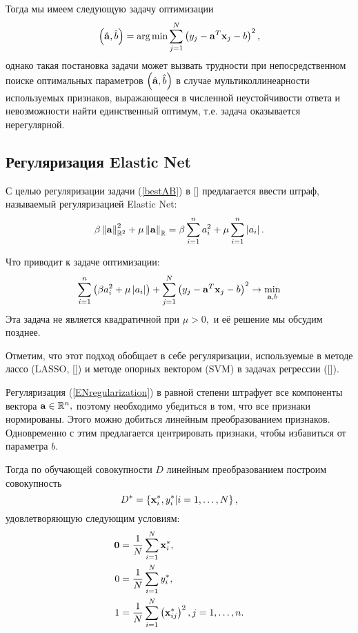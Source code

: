 Тогда мы имеем следующую задачу оптимизации 
\begin{equation}
	\label{bestAB}
	\left(\hat{\boldsymbol{\mathbf{a}}}, \hat b\right) = \mathop{\mbox{arg\ \!min}}\limits \sum\limits_{j=1}^N\left(y_j - \boldsymbol{\mathbf{a}}^T \boldsymbol{\mathbf{x}}_j - b\right)^2, 
\end{equation}
однако такая постановка задачи может вызвать трудности при непосредственном поиске оптимальных параметров $\left(\hat{\boldsymbol{\mathbf{a}}}, \hat b\right)$ в случае мультиколлинеарности используемых признаков, 
выражающееся в численной неустойчивости ответа и невозможности найти единственный оптимум, т.е. задача оказывается нерегулярной.

\subsection{Регуляризация Elastic Net}
С целью регуляризации задачи (\ref{bestAB}) в [] предлагается ввести штраф, называемый регуляризацией Elastic Net:
\begin{equation}
	\label{ENregularization}
	\beta \left\|{\boldsymbol{\mathbf{a}}}\right\|_{\mathbb R^2}^2 + \mu \left\|{\boldsymbol{\mathbf{a}}}\right\|_{\mathbb R} 
	= \beta \sum\limits_{i=1}^n a_i^2 + \mu \sum\limits_{i=1}^n \left|a_i\right|.
\end{equation}

Что приводит к задаче оптимизации: 
\begin{equation}
	\label{basicEN}
	\sum_{i=1}^n\left(\beta a_i^2 + \mu \left|a_i\right|\right) 
	+ \sum_{j=1}^N\left(y_j - \boldsymbol{\mathbf{a}}^T \boldsymbol{\mathbf{x}}_j - b\right)^2 
	\to \mathop{\mbox{min}}\limits_{\boldsymbol{\mathbf{a}}, b}
\end{equation}
Эта задача не является квадратичной при $\mu > 0,$ и её решение мы обсудим позднее.

Отметим, что этот подход обобщает в себе регуляризации, используемые в методе лассо (LASSO, []) и методе опорных вектором (SVM) в задачах регрессии ([]).

Регуляризация (\ref{ENregularization}) в равной степени штрафует все компоненты вектора $\boldsymbol{\mathbf{a}}\in \mathbb R^n,$ 
поэтому необходимо убедиться в том, что все признаки нормированы. 
Этого можно добиться линейным преобразованием признаков. 
Одновременно с этим предлагается центрировать признаки, чтобы избавиться от параметра $b$.

Тогда по обучающей совокупности $D$ линейным преобразованием построим совокупность
\begin{equation*}
	D^* = \left\{\boldsymbol{\mathbf{x}}^*_i, y^*_i | i = 1, \ldots, N\right\}, 
\end{equation*}
удовлетворяющую следующим условиям:
\begin{align}
	\label{normalization-start}
	\boldsymbol{\mathbf{0}} 	&= \frac1N\sum\limits_{i=1}^N\boldsymbol{\mathbf{x}}^*_i, \\
	0 		&= \frac1N\sum\limits_{i=1}^N y^*_i, \\
	\label{normalization-end}
	1 		&= \frac1N\sum\limits_{i=1}^N\left(\boldsymbol{\mathbf{x}}^*_{ij}\right)^2, j=1,\ldots, n.
\end{align}

